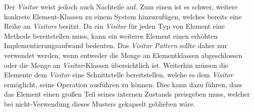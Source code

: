 Der \emph{Visitor} weist jedoch auch Nachteile auf. Zum einen ist es schwer, weitere konkrete Element-Klassen zu einem System hinzuzufügen, welches bereits eine Reihe an \emph{Visitors} besitzt. Da ein \emph{Visitor} für jeden Typ von Element eine Methode bereitstellen muss, kann ein weiteres Element einen erhöhten Implementierungsaufwand bedeuten. Das \emph{Visitor Pattern} sollte daher nur verwendet werden, wenn entweder die Menge an Elementklassen abgeschlossen oder die Menge an \emph{Visitor}-Klassen übersichtlich ist. Weiterhin müssen die Elemente dem \emph{Visitor} eine Schnittstelle bereitstellen, welche es dem \emph{Visitor} ermöglicht, seine Operation ausführen zu können. Dies kann dazu führen, dass das Element einen großen Teil seines internen Zustands preisgeben muss, welcher bei nicht-Verwendung dieses Musters gekapselt geblieben wäre. \cite{gamma_design_1995}